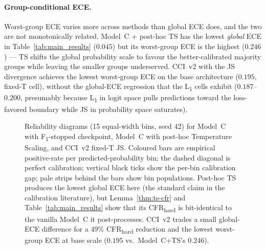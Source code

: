 \documentclass[10pt,a4paper]{article}
\begin{document}
\paragraph{Group-conditional ECE.}
Worst-group ECE varies more across methods than global ECE does, and the two are not monotonically related. Model~C + post-hoc TS has the lowest \emph{global} ECE in Table~\ref{tab:main_results} ($0.045$) but its worst-group ECE is the highest ($0.246$) --- TS shifts the global probability scale to favour the better-calibrated majority groups while leaving the smaller groups underserved. CCI~v2 with the JS divergence achieves the lowest worst-group ECE on the base architecture ($0.195$, fixed-T cell), without the global-ECE regression that the L\textsubscript{1} cells exhibit ($0.187$--$0.200$, presumably because L\textsubscript{1} in logit space pulls predictions toward the loss-favored boundary while JS in probability space saturates).

\begin{figure}[h]
\centering
\caption{Reliability diagrams (15 equal-width bins, seed 42) for Model~C with F\textsubscript{1}-stopped checkpoint, Model~C with post-hoc Temperature Scaling, and CCI~v2 fixed-T JS. Coloured bars are empirical positive-rate per predicted-probability bin; the dashed diagonal is perfect calibration; vertical black ticks show the per-bin calibration gap; pale strips behind the bars show bin populations. Post-hoc TS produces the lowest global ECE here (the standard claim in the calibration literature), but Lemma~\ref{thm:ts-cfr} and Table~\ref{tab:main_results} show that its CFR\textsubscript{hard} is bit-identical to the vanilla Model~C it post-processes. CCI~v2 trades a small global-ECE difference for a 49\% CFR\textsubscript{hard} reduction and the lowest worst-group ECE at base scale ($0.195$ vs.\ Model~C+TS's $0.246$).}
\label{fig:reliability}
\end{figure}
\end{document}
